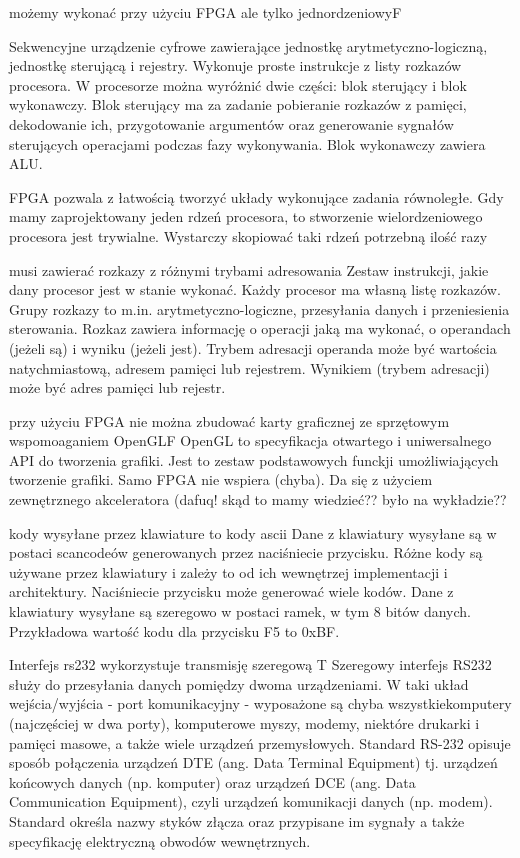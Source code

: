 {możemy wykonać przy użyciu FPGA ale tylko jednordzeniowy}{F}
{
Sekwencyjne urządzenie cyfrowe zawierające jednostkę arytmetyczno-logiczną, jednostkę sterującą i rejestry. Wykonuje proste instrukcje z listy rozkazów procesora. W procesorze można wyróżnić dwie części: blok sterujący i blok wykonawczy. Blok sterujący ma za zadanie pobieranie rozkazów z pamięci, dekodowanie ich, przygotowanie argumentów oraz generowanie sygnałów sterujących operacjami podczas fazy wykonywania. Blok wykonawczy zawiera ALU.

}
{FPGA pozwala z łatwością tworzyć układy wykonujące zadania równoległe. Gdy mamy zaprojektowany jeden rdzeń procesora, to stworzenie wielordzeniowego procesora jest trywialne. Wystarczy skopiować taki rdzeń potrzebną ilość razy}

{musi zawierać rozkazy z różnymi trybami adresowania}{}
{
Zestaw instrukcji, jakie dany procesor jest w stanie wykonać. Każdy procesor ma własną listę rozkazów. Grupy rozkazy to m.in. arytmetyczno-logiczne, przesyłania danych i przeniesienia sterowania. Rozkaz zawiera informację o operacji jaką ma wykonać, o operandach (jeżeli są) i wyniku (jeżeli jest). Trybem adresacji operanda może być wartościa natychmiastową, adresem pamięci lub rejestrem. Wynikiem (trybem adresacji) może być adres pamięci lub rejestr.
}
{}

{przy użyciu FPGA nie można zbudować karty graficznej ze sprzętowym wspomoaganiem OpenGL}{F}
{
OpenGL to specyfikacja otwartego i uniwersalnego API do tworzenia grafiki. Jest to zestaw podstawowych funckji umożliwiających tworzenie grafiki.
}
{Samo FPGA nie wspiera (chyba). Da się z użyciem zewnętrznego akceleratora \cite{fpga:logi3D} (dafuq! skąd to mamy wiedzieć?? było na wykładzie??}

{kody wysyłane przez klawiature to kody ascii}{}
{
Dane z klawiatury wysyłane są w postaci scancodeów generowanych przez naciśniecie przycisku. Różne kody są używane przez klawiatury i zależy to od ich wewnętrzej implementacji i architektury. Naciśniecie przycisku może generować wiele kodów. Dane z klawiatury wysyłane są szeregowo w postaci ramek, w tym 8 bitów danych. Przykładowa wartość kodu dla przycisku F5 to 0xBF.
}
{}


\label{odp:99}
\answer
{Interfejs rs232}
{wykorzystuje transmisję szeregową}
{T}
{
Szeregowy interfejs RS232 służy do przesyłania danych pomiędzy dwoma urządzeniami. W taki układ wejścia/wyjścia - port komunikacyjny - wyposażone są chyba wszystkiekomputery (najczęściej w dwa porty), komputerowe myszy, modemy, niektóre drukarki i pamięci masowe, a także wiele urządzeń przemysłowych.
}
{
Standard RS-232 opisuje sposób połączenia urządzeń DTE (ang. Data Terminal Equipment) tj. urządzeń końcowych danych (np. komputer) oraz urządzeń DCE (ang. Data Communication Equipment), czyli urządzeń komunikacji danych (np. modem). Standard określa nazwy styków złącza oraz przypisane im sygnały a także specyfikację elektryczną obwodów wewnętrznych.
}

